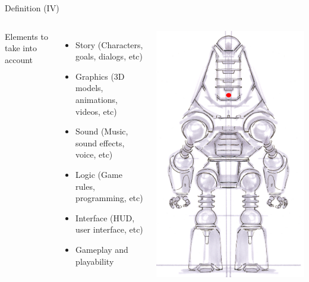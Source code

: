 \documentclass[10pt,compress]{beamer} %
\begin{document}
\begin{frame}{Definition (IV)}
    \begin{columns}
		Elements to take into account

 	 	\begin{itemize}
		\item Story (Characters, goals, dialogs, etc)
		\item Graphics (3D models, animations, videos, etc)
		\item Sound (Music, sound effects, voice, etc)
		\item Logic (Game rules, programming, etc)
		\item Interface (\alert{HUD}, user interface, etc)
		\item \alert{Gameplay} and playability
		\end{itemize}

		\centering\includegraphics[width=0.7\linewidth]{figs/ProtectronCA2}\\
	\end{columns}
\end{frame}
\end{document}
